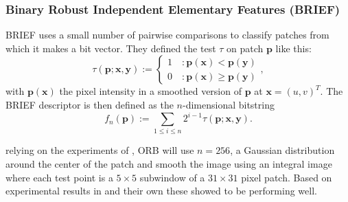 \subsubsection{Binary Robust Independent Elementary Features (BRIEF)}
BRIEF \cite{10.1007/978-3-642-15561-1_56} uses a small number of pairwise comparisons to classify patches from which it makes a bit vector. They defined the test $\tau$ on patch $\boldsymbol{p}$ like this:
\begin{equation}
    \tau(\boldsymbol{p};\boldsymbol{x},\boldsymbol{y}) := \left\{\begin{array}{ll}
         1\quad : \boldsymbol{p}(\boldsymbol{x}) < \boldsymbol{p}(\boldsymbol{y})\\
         0\quad : \boldsymbol{p}(\boldsymbol{x}) \geq \boldsymbol{p}(\boldsymbol{y})
    \end{array} \right.,
\end{equation}
with $\boldsymbol{p}(\boldsymbol{x})$ the pixel intensity in a smoothed version of $\boldsymbol{p}$ at $\boldsymbol{x} = (u, v)^T$. The BRIEF descriptor is then defined as the $n$-dimensional bitstring
\begin{equation}
    f_n(\boldsymbol{p}) := \sum_{1\leq i\leq n} 2^{i-1}\tau(\boldsymbol{p};\boldsymbol{x},\boldsymbol{y}) .
\end{equation}

relying on the experiments of \cite{10.1007/978-3-642-15561-1_56}, ORB will use $n = 256$, a Gaussian distribution around the center of the patch and smooth the image using an integral image where each test point is a $5 \times 5$ subwindow of a $31 \times 31$ pixel patch. Based on experimental results in \cite{10.1007/978-3-642-15561-1_56} and their own these showed to be performing well.